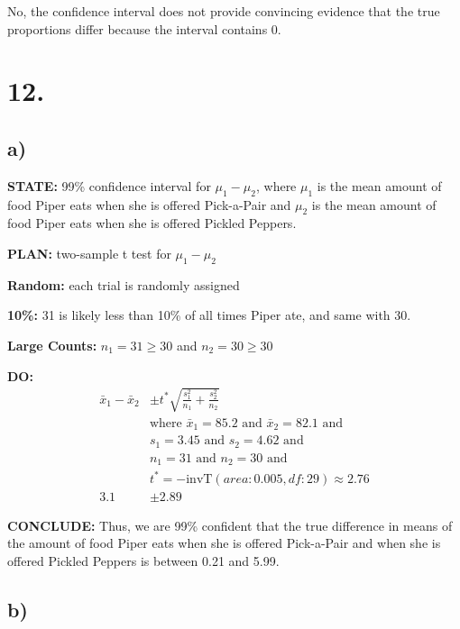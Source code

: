 \documentclass{article}
\begin{document}
No, the confidence interval does not provide convincing evidence that the true proportions differ because the interval contains 0.

\section*{12.}

\subsection*{a)}

\textbf{STATE:} 99\% confidence interval for $\mu_1 - \mu_2$, where $\mu_1$ is the mean amount of food Piper eats when she is offered Pick-a-Pair and $\mu_2$ is the mean amount of food Piper eats when she is offered Pickled Peppers.

\noindent\textbf{PLAN:} two-sample t test for $\mu_1 - \mu_2$

  \textbf{Random:} each trial is randomly assigned

  \textbf{10\%:} 31 is likely less than 10\% of all times Piper ate, and same with 30.

  \textbf{Large Counts:} $n_1 = 31 \ge 30$ and $n_2 = 30 \ge 30$

\noindent\textbf{DO:}
\begin{align*}
  \bar{x}_1 - \bar{x}_2 &\pm t^* \sqrt{\frac{s_1^2}{n_1}+\frac{s_2^2}{n_2}} \\ 
  & \text{where } \bar{x}_1 = 85.2 \text { and } \bar{x}_2 = 82.1 \text{ and} \\
  & s_1 = 3.45 \text{ and } s_2 = 4.62 \text{ and} \\
  & n_1 = 31 \text{ and } n_2 = 30 \text{ and} \\
  & t^* = -\text{invT}(area:0.005, df: 29) \approx 2.76 \\
  3.1 &\pm 2.89
\end{align*}

\noindent\textbf{CONCLUDE:} Thus, we are 99\% confident that the true difference in means of the amount of food Piper eats when she is offered Pick-a-Pair and when she is offered Pickled Peppers is between 0.21 and 5.99.

\subsection*{b)}
\end{document}
